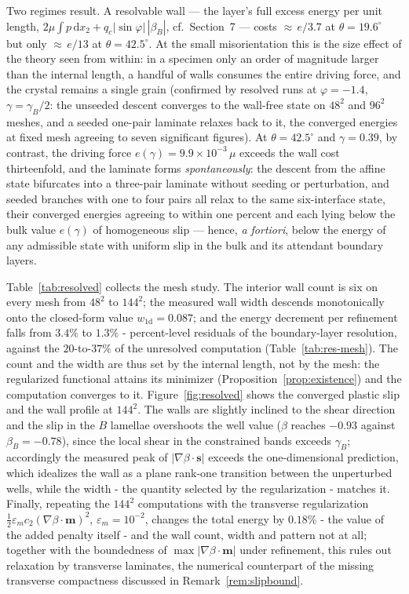 \documentclass[12pt]{article}
\theoremstyle{plain}
\theoremstyle{definition}
\newcommand{\bs}{\bm{s}}
\newcommand{\bmm}{\bm{m}}
\begin{document}
Two regimes result. A resolvable wall --- the layer's full excess energy per
unit length, $2\mu\!\int p\,\mathrm{d}x_{2}+q_{c}|\sin\varphi|\,|\beta_{B}|$,
cf.\ Section~7 --- costs ${\approx}\,e/3.7$ at $\theta=19.6^{\circ}$ but only
${\approx}\,e/13$ at $\theta=42.5^{\circ}$. At the small misorientation this
is the size effect of the theory \citep{koster2015aformation} seen from
within: in a specimen only an order of magnitude larger than the internal
length, a handful of walls consumes the entire driving force, and the crystal
remains a single grain (confirmed by resolved runs at $\varphi=-1.4$,
$\gamma=\gamma_B/2$: the unseeded descent converges to the wall-free state
on $48^{2}$ and $96^{2}$ meshes, and a seeded one-pair laminate relaxes
back to it, the converged energies at fixed mesh agreeing to seven
significant figures).  At $\theta=42.5^{\circ}$ and $\gamma=0.39$, by contrast, the driving force
$e(\gamma)=9.9\times10^{-3}\,\mu$ exceeds the wall cost thirteenfold, and
the laminate forms \emph{spontaneously}: the descent from the affine state
bifurcates into a three-pair laminate without seeding or perturbation, and
seeded branches with one to four pairs all relax to the same six-interface
state, their converged energies agreeing to within one percent and each
lying below the bulk value $e(\gamma)$ of homogeneous slip --- hence,
\emph{a fortiori}, below the energy of any admissible state with uniform
slip in the bulk and its attendant boundary layers.

Table~\ref{tab:resolved} collects the mesh study. The interior wall count is
six on every mesh from $48^{2}$ to $144^{2}$; the measured wall width
descends monotonically onto the closed-form value $w_{\mathrm{1d}}=0.087$;
and the energy decrement per refinement falls from $3.4\%$ to $1.3\%$ -
percent-level residuals of the boundary-layer resolution, against the
$20$-to-$37\%$ of the unresolved computation (Table~\ref{tab:res-mesh}). The
count and the width are thus set by the internal length, not by the mesh:
the regularized functional attains its minimizer (Proposition~\ref{prop:existence}) and the computation converges to it. Figure~\ref{fig:resolved} shows the converged plastic slip and the wall profile at $144^{2}$. The walls are slightly inclined to the shear direction and the slip in the $B$ lamellae overshoots the well value ($\beta$ reaches $-0.93$ against $\beta_B=-0.78$), since the local shear in the constrained
bands exceeds $\gamma_B$; accordingly the measured peak of
$|\nabla\beta\cdot\bs|$ exceeds the one-dimensional prediction, which
idealizes the wall as a plane rank-one transition between the unperturbed
wells, while the width - the quantity selected by the regularization - matches
it. Finally, repeating the $144^{2}$ computations with the transverse
regularization $\tfrac{1}{2}\varepsilon_m c_2(\nabla\beta\cdot\bmm)^{2}$,
$\varepsilon_m=10^{-2}$, changes the total energy by $0.18\%$ - the value of
the added penalty itself - and the wall count, width and pattern not at all;
together with the boundedness of $\max|\nabla\beta\cdot\bmm|$ under
refinement, this rules out relaxation by transverse laminates, the numerical
counterpart of the missing transverse compactness discussed in
Remark~\ref{rem:slipbound}.
\end{document}
